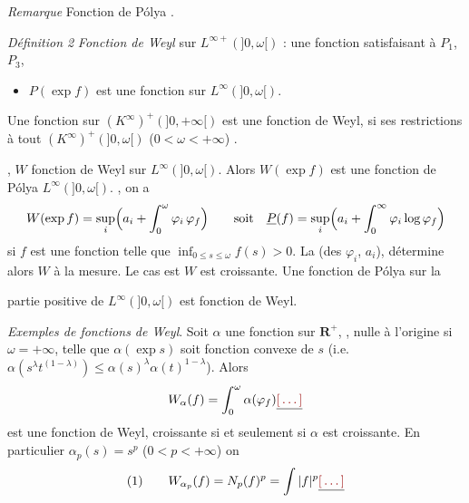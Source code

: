 \documentclass[11pt,a4paper]{article}
\begin{document}
\emph{Remarque} Fonction de Pólya \ill{}  .

\emph{Définition 2} \emph{Fonction de Weyl} sur $L^{\infty +}(]0, \omega[)$  :  une fonction satisfaisant à $P_1$, $P_3$, \struck{\ill{}}  \struck{\ill{}}
\begin{itemize}
  \item[($W_1$)] $P(\exp f)$ est une fonction  sur $L^\infty(]0, \omega[)$.
\end{itemize}
Une fonction sur $(K^{\infty})^{+}(]0, +\infty[)$ est une fonction de Weyl, si ses restrictions à tout $(K^\infty)^{+}(]0, \omega[)$ ($0 < \omega < +\infty$) . 

 \emph{}, $W$ fonction de Weyl sur $L^{\infty}(]0, \omega[)$. Alors \struck{\ill{}} $W(\exp f)$ est une fonction de Pólya  $L^\infty(]0, \omega[)$. , on a
\[
  W(\exp f) = \sup_i \Bigl( a_i + \int_0^{\omega} \varphi_i\,\varphi_f \Bigr) \qquad
  \text{soit}\quad \uncertain{P}(f) = \sup_i \Bigl( a_i + \int_0^{\infty} \varphi_i \log\varphi_f \Bigr)
\]
 si $f$ est une fonction  telle que \struck{\ill{}} $\inf_{0 \leq s \leq \omega} f(s) > 0$. La   (des $\varphi_i$, $a_i$), détermine alors $W$   à la   mesure. Le cas \ill{}  est  $W$ est croissante. Une fonction de Pólya sur la

partie positive de $L^\infty(]0, \omega[)$ est \ill{} fonction de Weyl. 

\emph{Exemples de fonctions de Weyl}. Soit $\alpha$ une fonction sur $\mathbf{R}^{+}$, , nulle à l'origine si $\omega = +\infty$,  telle que $\alpha(\exp s)$ soit fonction convexe de $s$ (i.e. $\alpha(s^\lambda t^{(1-\lambda)}) \leq \alpha(s)^\lambda\alpha(t)^{1-\lambda}$). Alors
\[
  W_\alpha(f) = \int_0^\omega \alpha(\varphi_f) \struck{\ill{}}
\]
est une fonction de Weyl, croissante si et seulement si $\alpha$ est croissante. En particulier  $\alpha_p(s) = s^p$ ($0 < p < +\infty$) on 
\[
  \text{(1)}\qquad W_{\alpha_p}(f) = N_p(f)^p = \int |f|^p \struck{\ill{}}
\]
\end{document}
